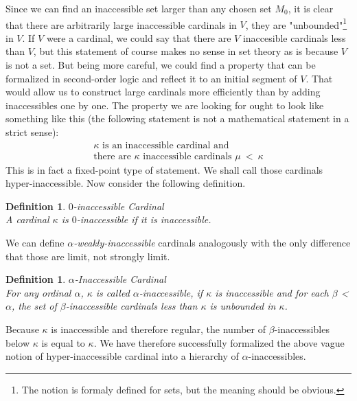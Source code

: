\documentclass[12pt,a4paper]{article}
\newtheorem{definition}[theorem]{Definition}
\begin{document}
Since we can find an inaccessible set larger than any chosen set $M_0$, it is clear that there are arbitrarily large inaccessible cardinals in $V$, they are "unbounded"\footnote{The notion is formaly defined for sets, but the meaning should be obvious.} in $V$. If $V$ were a cardinal, we could say that there are $V$ inaccesible cardinals less than $V$, but this statement of course makes no sense in set theory as is because $V$ is not a set. But being more careful, we could find a property that can be formalized in second-order logic and reflect it to an initial segment of $V$. That would allow us to construct large cardinals more efficiently than by adding inaccessibles one by one. The property we are looking for ought to look like something like this (the following statement is not a mathematical  statement in a strict sense):
\begin{equation}
\begin{gathered}
\kappa \mbox{ is an inaccessible cardinal and}\\
\mbox{there are }\kappa\mbox{ inaccessible cardinals }\mu\ <\ \kappa
\end{gathered}
\end{equation}
This is in fact a fixed-point type of statement. We shall call those cardinals hyper-inaccessible. Now consider the following definition.

\begin{definition}{$0$-inaccessible Cardinal}\\
A cardinal $\kappa$ is $0$-inaccessible if it is inaccessible.
\end{definition}
We can define \emph{$\alpha$-weakly-inaccessible} cardinals analogously with the only difference that those are limit, not strongly limit.

\begin{definition}{$\alpha$-Inaccessible Cardinal}\label{def:alpha_inaccessible}\\
For any ordinal $\alpha$, $\kappa$ is called $\alpha$-inaccessible, if $\kappa$ is inaccessible and for each $\beta$ < $\alpha$, the set of $\beta$-inaccessible cardinals less than $\kappa$ is unbounded in $\kappa$.
\end{definition}

Because $\kappa$ is inaccessible and therefore regular, the number of $\beta$-inaccessibles below $\kappa$ is equal to $\kappa$. We have therefore successfully formalized the above vague notion of hyper-inaccessible cardinal into a hierarchy of $\alpha$-inaccessibles.
\end{document}
